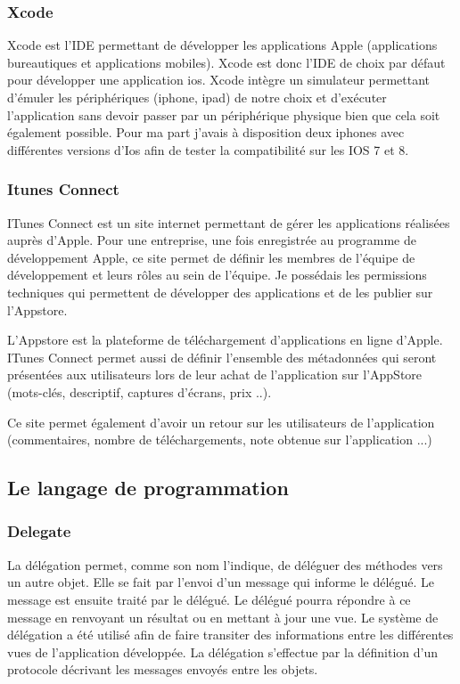 \subsubsection{Xcode}
Xcode est l’IDE permettant de développer les applications Apple (applications bureautiques et applications mobiles). Xcode est donc l’IDE de choix par défaut pour développer une application ios. Xcode intègre un simulateur permettant d’émuler les périphériques (iphone, ipad) de notre choix et d’exécuter l’application sans devoir passer par un périphérique physique bien que cela soit également possible. Pour ma part j'avais à disposition deux iphones avec différentes versions d'Ios afin de tester la compatibilité sur les IOS 7 et 8. 

\subsubsection{Itunes Connect}
ITunes Connect est un site internet permettant de gérer les applications réalisées auprès d’Apple. Pour une entreprise, une fois enregistrée au programme de développement Apple, ce site permet de définir les membres de l’équipe de développement et leurs rôles au sein de l’équipe. Je possédais les permissions techniques qui permettent de développer des applications et de les publier sur l’Appstore. 

L'Appstore est la plateforme de téléchargement d'applications en ligne d'Apple. ITunes Connect permet aussi de définir l’ensemble des métadonnées qui seront présentées aux utilisateurs lors de leur achat de l’application sur l’AppStore (mots-clés, descriptif, captures d’écrans, prix ..).

Ce site permet également d'avoir un retour sur les utilisateurs de l'application (commentaires, nombre de téléchargements, note obtenue sur l'application ...)


\subsection{Le langage de programmation}

\subsubsection{Delegate}

La délégation permet, comme son nom l'indique, de déléguer des méthodes vers un autre objet. Elle se fait par l'envoi d'un message qui informe le délégué. Le message est ensuite traité par le délégué. Le délégué pourra répondre à ce message en renvoyant un résultat ou en mettant à jour une vue. Le système de délégation a été utilisé afin de faire transiter des informations entre les différentes vues de l'application développée. La délégation s'effectue par la définition d'un protocole décrivant les messages envoyés entre les objets.

